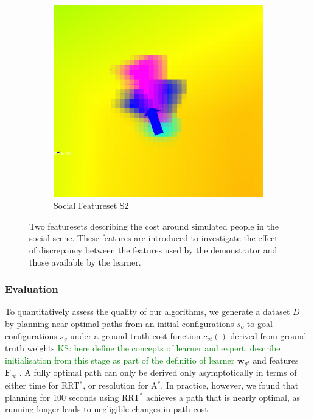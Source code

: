 \documentclass{article}  %
\newcommand{\ks}[1]{\textcolor{green}{KS: #1}}
\begin{document}
\begin{figure}[tbh]
\begin{subfigure}[b]{0.42\columnwidth}
    \includegraphics[scale=0.2]{images/person_feat1.png}
    \caption{Social Featureset S2}
    \label{fig:S2}
  \end{subfigure} 
  \caption{Two featuresets describing the cost around simulated people in the social scene. These features are introduced to investigate the effect of discrepancy between the features used by the demonstrator and those available by the learner.}
    \vspace{-2mm}
  \label{fig:setting}
  \end{figure}


	\subsubsection{Evaluation}

	To quantitatively assess the quality of our algorithms, we generate a dataset $D$ by planning near-optimal paths from an initial configurations $s_o$ to goal configurations $s_g$ under a ground-truth cost function $c_{gt}()$ derived from ground-truth weights \ks{here define the concepts of learner and expert. describe initialisation from this stage as part of the definitio of learner} $\mathbf{w}_{gt}$ and features $\mathbf{F}_{gt}$ . A fully optimal path can only be derived only asymptotically in terms of either time  for RRT$^*$, or resolution for A$^*$. In practice, however, we found that planning for 100 seconds using  RRT$^*$  achieves a path that is nearly optimal, as running longer leads to negligible changes in path cost. 
\end{document}
